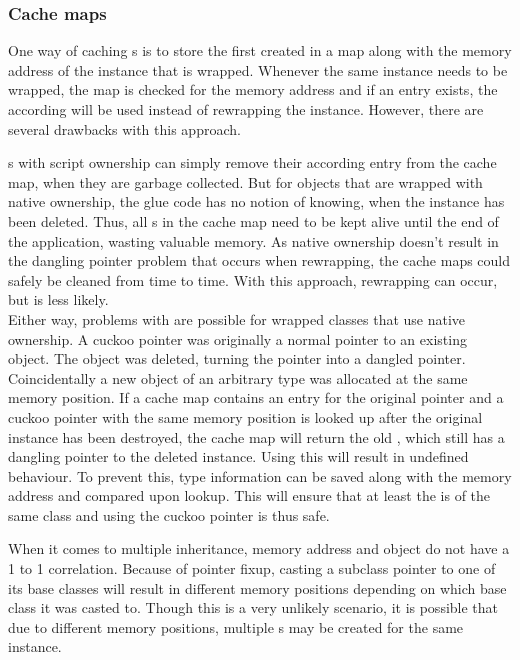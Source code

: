 \subsubsection{Cache maps}

One way of caching s is to store the first created  in a map along with the memory address of the instance that is wrapped. Whenever the same instance needs to be wrapped, the map is checked for the memory address and if an entry exists, the according  will be used instead of rewrapping the  instance. However, there are several drawbacks with this approach.

s with script ownership can simply remove their according entry from the cache map, when they are garbage collected. But for objects that are wrapped with native ownership, the glue code has no notion of knowing, when the  instance has been deleted. Thus, all s in the cache map need to be kept alive until the end of the application, wasting valuable memory. As native ownership doesn't result in the  dangling pointer problem that occurs when rewrapping, the cache maps could safely be cleaned from time to time. With this approach, rewrapping can occur, but is less likely.\\
Either way, problems with  are possible for wrapped classes that use native ownership. A cuckoo pointer was originally a normal pointer to an existing object. The object was deleted, turning the pointer into a dangled pointer. Coincidentally a new object of an arbitrary type was allocated at the same memory position. If a cache map contains an entry for the original pointer and a cuckoo pointer with the same memory position is looked up after the original instance has been destroyed, the cache map will return the old , which still has a dangling pointer to the deleted instance. Using this  will result in undefined behaviour. To prevent this, type information can be saved along with the memory address and compared upon lookup. This will ensure that at least the  is of the same class and using the cuckoo pointer is thus safe.

When it comes to multiple inheritance, memory address and object do not have a 1 to 1 correlation. Because of pointer fixup, casting a subclass pointer to one of its base classes will result in different memory positions depending on which base class it was casted to. Though this is a very unlikely scenario, it is possible that due to different memory positions, multiple s may be created for the same instance.


